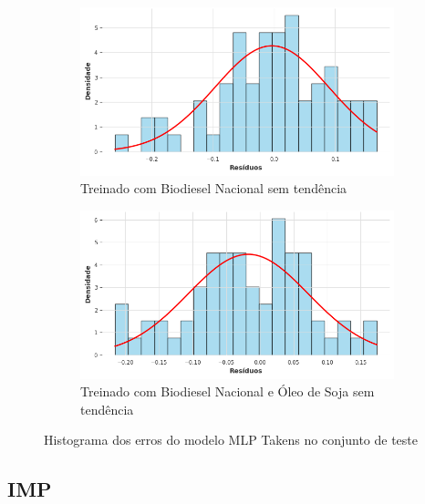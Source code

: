 \begin{figure}[htbp]
	\begin{subfigure}[b]{0.40\textwidth}
		\centering
		\includegraphics[width=\textwidth]{figuras/mlp_takens_brasil_detrend_residuals_histogram.png} %
		\caption{Treinado com Biodiesel Nacional sem tendência}
		\label{fig:mlp_takens_brasil_detrend_residuals_histogram}
	\end{subfigure}
	\hfill
	\begin{subfigure}[b]{0.40\textwidth}
		\centering
		\includegraphics[width=\textwidth]{figuras/mlp_takens_brasil_oil_detrend_residuals_histogram.png} %
		\caption{Treinado com Biodiesel Nacional e Óleo de Soja sem tendência}
		\label{fig:mlp_takens_brasil_oil_detrend_residuals_histogram}
	\end{subfigure}

	\caption{Histograma dos erros do modelo \acs{MLP} Takens no conjunto de teste}
	\label{fig:mlp_takens_residuals_histogram}
\end{figure}

\subsection{\acs{IMP}}
